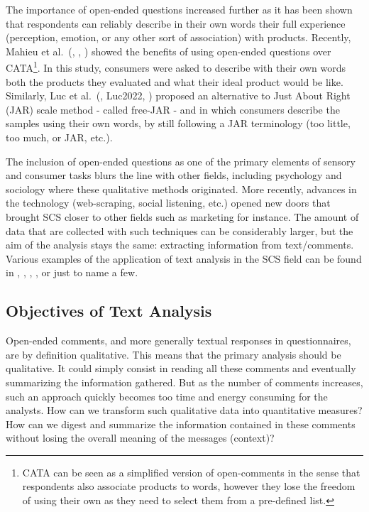 \documentclass[
]{krantz}
\begin{document}
The importance of open-ended questions increased further as it has been shown that respondents can reliably describe in their own words their full experience (perception, emotion, or any other sort of association) with products. Recently, Mahieu et al.~(\citet{Mahieu2020}, \citet{Mahieu2022}, \citet{Visalli2020}) showed the benefits of using open-ended questions over CATA\footnote{CATA can be seen as a simplified version of open-comments in the sense that respondents also associate products to words, however they lose the freedom of using their own as they need to select them from a pre-defined list.}. In this study, consumers were asked to describe with their own words both the products they evaluated and what their ideal product would be like. Similarly, Luc et al.~(\citet{Luc2020}, Luc2022, \citet{Luc2022a}) proposed an alternative to Just About Right (JAR) scale method - called free-JAR - and in which consumers describe the samples using their own words, by still following a JAR terminology (too little, too much, or JAR, etc.).

The inclusion of open-ended questions as one of the primary elements of sensory and consumer tasks blurs the line with other fields, including psychology and sociology where these qualitative methods originated. More recently, advances in the technology (web-scraping, social listening, etc.) opened new doors that brought SCS closer to other fields such as marketing for instance. The amount of data that are collected with such techniques can be considerably larger, but the aim of the analysis stays the same: extracting information from text/comments. Various examples of the application of text analysis in the SCS field can be found in \citet{BecueBertaut2008}, \citet{TenKleij2003}, \citet{Hamilton2020}, \citet{Vidal2015}, or \citet{Feldmeyer2022} just to name a few.

\hypertarget{objectives-of-text-analysis}{%
\subsection{Objectives of Text Analysis}\label{objectives-of-text-analysis}}

Open-ended comments, and more generally textual responses in questionnaires, are by definition qualitative. This means that the primary analysis should be qualitative. It could simply consist in reading all these comments and eventually summarizing the information gathered. But as the number of comments increases, such an approach quickly becomes too time and energy consuming for the analysts. How can we transform such qualitative data into quantitative measures? How can we digest and summarize the information contained in these comments without losing the overall meaning of the messages (context)?
\end{document}
